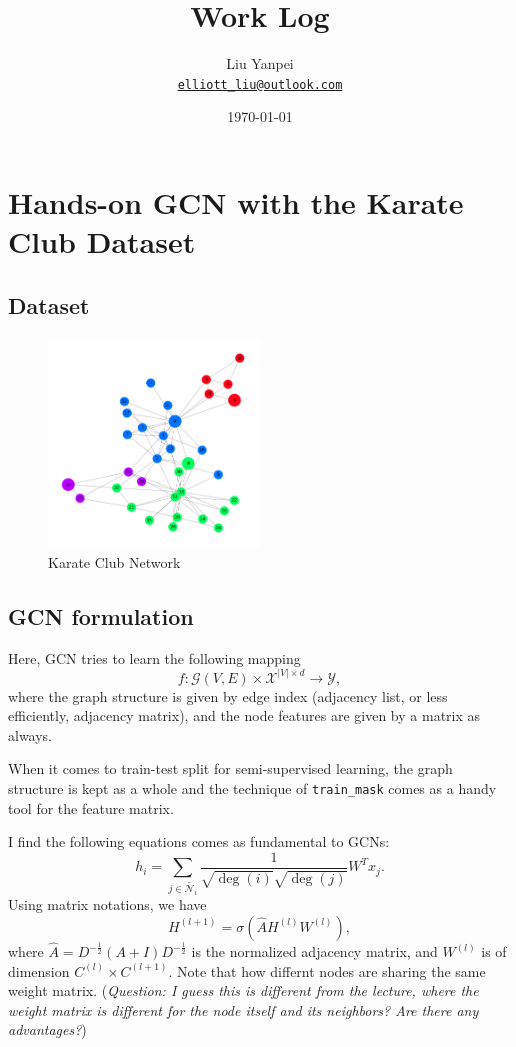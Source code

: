 \documentclass{article}
\title{\textbf{Work Log}}
\author{Liu Yanpei \\ \href{mailto:elliott_liu@outlook.com}{\texttt{elliott\_liu@outlook.com}}}
\date{\today}
\begin{document}
\maketitle

\section*{Hands-on GCN with the Karate Club Dataset}

\subsection*{Dataset}
\begin{figure}[h]
  \centering
  \includegraphics[width=0.5\textwidth]{karateclub.png}
  \caption{Karate Club Network}
  \label{fig:karate}
\end{figure}

\subsection*{GCN formulation}
Here, GCN tries to learn the following mapping
\[f:\mathcal{G}(V,E)\times\mathcal{X}^{|V|\times d}\rightarrow\mathcal{Y},\]
where the graph structure is given by edge index (adjacency list, or less efficiently, adjacency matrix), and the node features are given by a matrix as always.

When it comes to train-test split for semi-supervised learning, the graph structure is kept as a whole and the technique of \texttt{train\_mask} comes as a handy tool for the feature matrix.

I find the following equations comes as fundamental to GCNs:
\[
h_i = \sum_{j\in\tilde{\mathcal{N}_i}}\frac{1}{\sqrt{\deg(i)} \sqrt{\deg(j)}} {W}^T x_j.
\]
Using matrix notations, we have
\[
H^{(l+1)} = \sigma(\hat{A}H^{(l)}W^{(l)}),
\]
where $\hat{A} = {D}^{-\frac{1}{2}}(A + I){D}^{-\frac{1}{2}}$ is the normalized adjacency matrix, and $W^{(l)}$ is of dimension $C^{(l)}\times C^{(l+1)}$. Note that how differnt nodes are sharing the same weight matrix. (\emph{Question: I guess this is different from the lecture, where the weight matrix is different for the node itself and its neighbors? Are there any advantages?})
\end{document}
